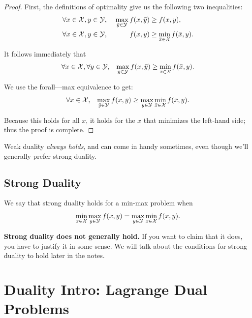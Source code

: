 \documentclass[12pt]{article}
\begin{document}
\begin{proof}
First, the definitions of optimality give us the following two inequalities:
%
\begin{align*}
\forall x\in {\mathcal X}, y\in {\mathcal Y}, && \; \max_{\bar{y} \in {\mathcal Y}} f(x, \bar{y}) &\geq f(x,y), \\ 
\forall x\in {\mathcal X}, y\in {\mathcal Y}, && \; f(x, y) &\geq \min_{\bar{x} \in {\mathcal X}} f(\bar{x},y).
\end{align*}

It follows immediately that
%
\begin{equation*}
\forall x\in{\mathcal X}, \forall y \in {\mathcal Y}, \;\;\;\max_{\bar{y} \in {\mathcal Y}} f(x, \bar{y}) \geq \min_{\bar{x} \in {\mathcal X}} f(\bar{x},y).
\end{equation*}

We use the forall---max equivalence to get:
%
\begin{equation*}
\forall x\in{\mathcal X}, \;\;\;\max_{\bar{y} \in {\mathcal Y}} f(x, \bar{y}) \geq \max_{y \in {\mathcal Y}} \min_{\bar{x} \in {\mathcal X}} f(\bar{x},y).
\end{equation*}

Because this holds for all $x$, it holds for the $x$ that minimizes the left-hand side; thus the proof is complete.
\end{proof}

Weak duality \textit{always holds}, and can come in handy sometimes, even though we'll generally prefer strong duality. 

\subsection{Strong Duality}

We say that strong duality holds for a min-max problem when
%
\begin{equation*}
\min_{x \in {\mathcal X}} \max_{y \in {\mathcal Y}} f(x,y) = \max_{y \in {\mathcal Y}} \min_{x \in {\mathcal X}} f(x,y).
\end{equation*}

\textbf{Strong duality does not generally hold.} If you want to claim that it does, you have to justify it in some sense. We will talk about the conditions for strong duality to hold later in the notes.

\pagebreak

\section{Duality Intro: Lagrange Dual Problems}
\end{document}
